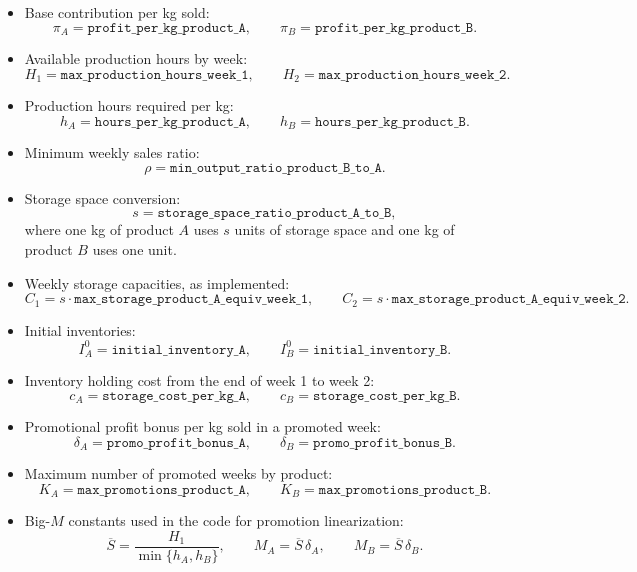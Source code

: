 \begin{itemize}
    \item Base contribution per kg sold:
    \[
    \pi_A = \texttt{profit\_per\_kg\_product\_A}, \qquad
    \pi_B = \texttt{profit\_per\_kg\_product\_B}.
    \]

    \item Available production hours by week:
    \[
    H_1 = \texttt{max\_production\_hours\_week\_1}, \qquad
    H_2 = \texttt{max\_production\_hours\_week\_2}.
    \]

    \item Production hours required per kg:
    \[
    h_A = \texttt{hours\_per\_kg\_product\_A}, \qquad
    h_B = \texttt{hours\_per\_kg\_product\_B}.
    \]

    \item Minimum weekly sales ratio:
    \[
    \rho = \texttt{min\_output\_ratio\_product\_B\_to\_A}.
    \]

    \item Storage space conversion:
    \[
    s = \texttt{storage\_space\_ratio\_product\_A\_to\_B},
    \]
    where one kg of product $A$ uses $s$ units of storage space and one kg of product $B$ uses one unit.

    \item Weekly storage capacities, as implemented:
    \[
    C_1 = s \cdot \texttt{max\_storage\_product\_A\_equiv\_week\_1}, \qquad
    C_2 = s \cdot \texttt{max\_storage\_product\_A\_equiv\_week\_2}.
    \]

    \item Initial inventories:
    \[
    I_A^0 = \texttt{initial\_inventory\_A}, \qquad
    I_B^0 = \texttt{initial\_inventory\_B}.
    \]

    \item Inventory holding cost from the end of week 1 to week 2:
    \[
    c_A = \texttt{storage\_cost\_per\_kg\_A}, \qquad
    c_B = \texttt{storage\_cost\_per\_kg\_B}.
    \]

    \item Promotional profit bonus per kg sold in a promoted week:
    \[
    \delta_A = \texttt{promo\_profit\_bonus\_A}, \qquad
    \delta_B = \texttt{promo\_profit\_bonus\_B}.
    \]

    \item Maximum number of promoted weeks by product:
    \[
    K_A = \texttt{max\_promotions\_product\_A}, \qquad
    K_B = \texttt{max\_promotions\_product\_B}.
    \]

    \item Big-$M$ constants used in the code for promotion linearization:
    \[
    \overline{S} = \frac{H_1}{\min\{h_A,h_B\}}, \qquad
    M_A = \overline{S}\,\delta_A, \qquad
    M_B = \overline{S}\,\delta_B.
    \]
\end{itemize}

